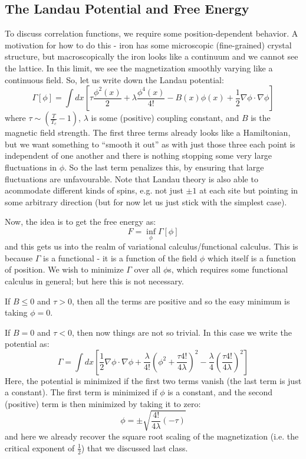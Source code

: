 \subsection{The Landau Potential and Free Energy}
To discuss correlation functions, we require some position-dependent behavior. A motivation for how to do this - iron has some microscopic (fine-grained) crystal structure, but macroscopically the iron looks like a continuum and we cannot see the lattice. In this limit, we see the magnetization smoothly varying like a continuous field. So, let us write down the Landau potential:
\begin{equation}
    \Gamma[\phi] = \int dx \left[\tau \frac{\phi^2(x)}{2}  + \lambda \frac{\phi^4(x)}{4!} -B(x)\phi(x) + \frac{1}{2}\nabla \phi \cdot \nabla \phi\right]
\end{equation}
where $\tau \sim \left(\frac{T}{T_c} - 1\right)$, $\lambda$ is some (positive) coupling constant, and $B$ is the magnetic field strength. The first three terms already looks like a Hamiltonian, but we want something to ``smooth it out'' as with just those three each point is independent of one another and there is nothing stopping some very large fluctuations in $\phi$. So the last term penalizes this, by ensuring that large fluctuations are unfavourable. Note that Landau theory is also able to acommodate different kinds of spins, e.g. not just $\pm 1$ at each site but pointing in some arbitrary direction (but for now let us just stick with the simplest case).

Now, the idea is to get the free energy as:
\begin{equation}
    F = \inf_\phi \Gamma[\phi]
\end{equation}
and this gets us into the realm of variational calculus/functional calculus. This is because $\Gamma$ is a functional - it is a function of the field $\phi$ which itself is a function of position. We wish to minimize $\Gamma$ over all $\phi$s, which requires some functional calculus in general; but here this is not necessary.

If $B \leq 0$ and $\tau > 0$, then all the terms are positive and so the easy minimum is taking $\phi = 0$. 

If $B = 0$ and $\tau < 0$, then now things are not so trivial. In this case we write the potential as:
\begin{equation}
    \Gamma = \int dx \left[\frac{1}{2}\nabla \phi \cdot \nabla \phi + \frac{\lambda}{4!}\left(\phi^2 + \frac{\tau 4!}{4\lambda}\right)^2 - \frac{\lambda}{4}\left(\frac{\tau 4!}{4\lambda}\right)^2\right]
\end{equation}
Here, the potential is minimized if the first two terms vanish (the last term is just a constant). The first term is minimized if $\phi$ is a constant, and the second (positive) term is then minimized by taking it to zero:
\begin{equation}
    \phi = \pm \sqrt{\frac{4!}{4\lambda}(-\tau)}
\end{equation}
and here we already recover the square root scaling of the magnetization (i.e. the critical exponent of $\frac{1}{2}$) that we discussed last class.

